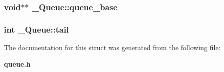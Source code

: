 \subsubsection{\setlength{\rightskip}{0pt plus 5cm}void$\ast$$\ast$ \bf{\_\-Queue::queue\_\-base}}\label{struct__Queue_a7c54852d04b9ea8e70ead173c13d36e}


\subsubsection{\setlength{\rightskip}{0pt plus 5cm}int \bf{\_\-Queue::tail}}\label{struct__Queue_1231e4212537450687e750ba48008a49}




The documentation for this struct was generated from the following file:\begin{CompactItemize}
\item 
\bf{queue.h}\end{CompactItemize}
